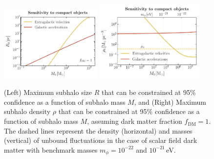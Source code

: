\documentclass[prd,aps,10pt,nofootinbib,twocolumn,superscriptaddress,preprintnumbers,balancelastpage,longbibliography]{revtex4-1}
\begin{document}


\begin{figure}[htbp]
  \centering
  \includegraphics[width=0.45\textwidth]{plots/compact_M_vs_R}
  \includegraphics[width=0.48\textwidth]{plots/compact_M_vs_rho}
  \caption{(Left) Maximum subhalo size $R$ that can be constrained at 95\% confidence as a function of subhalo mass $M$, and (Right) Maximum subhalo density $\rho$ that can be constrained at 95\% confidence as a function of subhalo mass $M$, assuming dark matter fraction $f_\mathrm{DM}=1$. The dashed lines represent the density (horizontal) and masses (vertical) of unbound fluctuations in the case of scalar field dark matter with benchmark masses $m_\phi = 10^{-22}$ and $10^{-21}$\,eV.} 
  \label{fig:compact_sens}
\end{figure}
\end{document}
